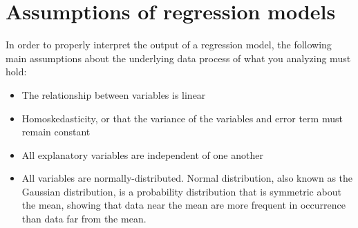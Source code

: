 \section{Assumptions of regression models}
    In order to properly interpret the output of a regression model, the following main assumptions about the underlying data process of what you analyzing must hold:
    \begin{itemize}
        \item The relationship between variables is linear
        \item Homoskedasticity, or that the variance of the variables and error term must remain constant
        \item All explanatory variables are independent of one another
        \item All variables are normally-distributed. Normal distribution, also known as the Gaussian distribution, is a probability distribution that is symmetric about the mean, showing that data near the mean are more frequent in occurrence than data far from the mean.
    \end{itemize}